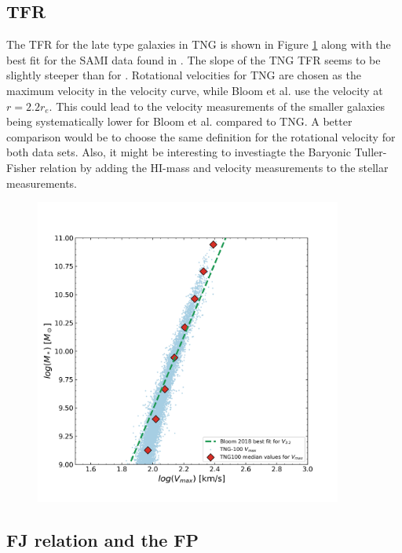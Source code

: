 \subsection{TFR}
The TFR for the late type galaxies in TNG is shown in Figure \ref{tfr_res} along with the best fit for the SAMI data found in \cite{Bloom2017}. The slope of the TNG TFR seems to be slightly steeper than for \cite{Bloom2017}. Rotational velocities for TNG are chosen as the maximum velocity in the velocity curve, while Bloom et al. use the velocity at $r = 2.2 r_e$. This could lead to the velocity measurements of the smaller galaxies being systematically lower for Bloom et al. compared to TNG. A better comparison would be to choose the same definition for the rotational velocity for both data sets. Also, it might be interesting to investiagte the Baryonic Tuller-Fisher relation by adding the HI-mass and velocity measurements to the stellar measurements.

\begin{figure}
    \centering
    \includegraphics[width=0.9\textwidth]{images/results_tully_fisher.png}
    \caption{}
    \label{tfr_res}
\end{figure}

\subsection{FJ relation and the FP}

